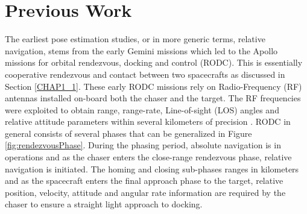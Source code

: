 \section{Previous Work}\label{CHAP1_3}
The earliest pose estimation studies, or in more generic terms, relative navigation, stems from the early Gemini missions \cite{chamberlinGemini64} which led to the Apollo missions \cite{youngApollo70} for orbital rendezvous, docking and control (RODC). This is essentially cooperative rendezvous and contact between two spacecrafts as discussed in Section \ref{CHAP1_1}. These early RODC missions rely on Radio-Frequency (RF) antennas installed on-board both the chaser and the target. The RF frequencies were exploited to obtain range, range-rate, Line-of-sight (LOS) angles and relative attitude parameters within several kilometers of precision \cite{fehse_2003, woffidenRez07}. RODC in general consists of  several phases that can be generalized in  Figure \ref{fig:rendezvousPhase}. During the phasing period, absolute navigation is in operations and as the chaser enters the close-range rendezvous phase, relative navigation is initiated. The homing and closing sub-phases ranges in kilometers and as the spacecraft enters the final approach phase to the target, relative position, velocity, attitude and angular rate information are required by the chaser to ensure a  straight light approach to docking. 

